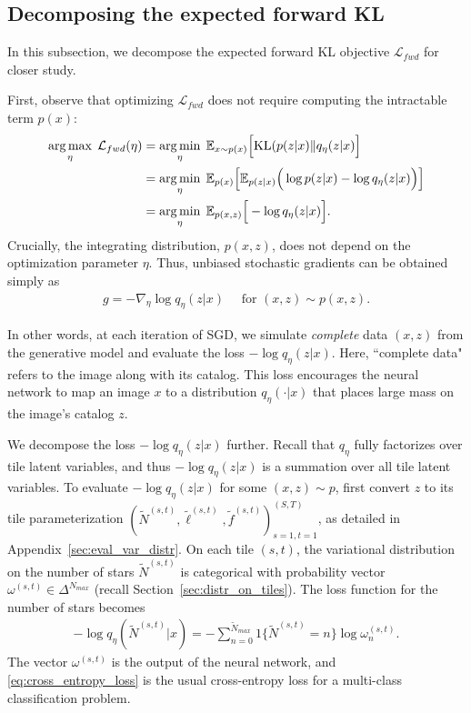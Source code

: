 \subsection{Decomposing the expected forward KL}
\label{sec:sleep_details}
In this subsection, we decompose the expected forward KL objective $\mathcal{L}_{fwd}$ for closer study.

First, observe that optimizing $\mathcal{L}_{fwd}$ does not require computing the intractable term $p(x)$:
\begin{align}
\operatorname*{arg\,max}_\eta\; \mathcal{L}_{fwd}(\eta)
    & = \operatorname*{arg\,min}_{\eta} \; \mathbb{E}_{x \sim p(x)}\Big[ \mathrm{KL}(p(z | x) \| q_\eta(z | x)\Big] \\
  &=\operatorname*{arg\,min}_{\eta} \; \mathbb E_{p(x)}\Big[\mathbb E_{p(z | x)}\Big(\log p(z | x) - \log q_\eta(z | x) \Big)\Big]\\
&=\operatorname*{arg\,min}_{\eta} \; \mathbb E_{p(x, z)}\Big[- \log q_\eta(z | x) \Big]\label{eq:sleep_loss_simple}.
\end{align}
Crucially, the integrating distribution, $p(x,z)$, does not depend on the optimization parameter $\eta$.
Thus, unbiased stochastic gradients can be obtained simply as
\begin{align}
    g = -\nabla_\eta \log q_\eta(z | x) \quad \text{ for } (x, z)\sim p(x, z).
\end{align}

In other words, at each iteration of SGD, we simulate {\itshape complete} data $(x,z)$ from the generative model and evaluate the loss $-\log q_\eta(z | x)$.
Here, ``complete data" refers to the image along with its catalog.
This loss encourages the neural network to map an image $x$ to a distribution $q_{\eta}(\cdot | x)$ that places large mass on the image's catalog $z$.

We decompose the loss $-\log q_\eta(z | x)$ further.
Recall that $q_\eta$ fully factorizes over tile latent variables, and thus $-\log q_\eta(z | x)$ is a summation over all tile latent variables.
To evaluate $-\log q_\eta(z | x)$ for some $(x,z)\sim p$, first convert $z$ to its tile parameterization $(\tilde N^{(s,t)}, \tilde \ell^{(s,t)}, \tilde f^{(s,t)})_{s=1,t=1}^{(S,T)}$, as detailed in Appendix~\ref{sec:eval_var_distr}.
On each tile $(s,t)$, the variational distribution on the number of stars $\tilde N^{(s,t)}$ is categorical with probability vector $\omega^{(s,t)}\in\Delta^{N_{max}}$ (recall Section~\ref{sec:distr_on_tiles}).
The loss function for the number of stars becomes
\begin{align}
    - \log q_\eta(\tilde N^{(s,t)} | x) = -\sum_{n = 0}^{\tilde N_{max}} 1\{\tilde N^{(s,t)} = n\} \log \omega^{(s,t)}_n.
    \label{eq:cross_entropy_loss}
\end{align}
The vector $\omega^{(s,t)}$ is the output of the neural network, and \eqref{eq:cross_entropy_loss} is the usual cross-entropy loss for a multi-class classification problem.

